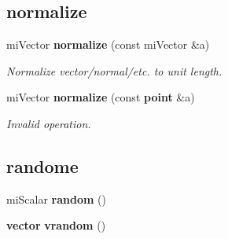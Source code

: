 \subsection*{normalize}
\begin{CompactItemize}
\item 
mi\-Vector {\bf normalize} (const mi\-Vector \&a)
\begin{CompactList}\small\item\em Normalize vector/normal/etc. to unit length. \item\end{CompactList}\item 
mi\-Vector {\bf normalize} (const {\bf point} \&a)
\begin{CompactList}\small\item\em Invalid operation. \item\end{CompactList}\end{CompactItemize}
\subsection*{randome}
\begin{CompactItemize}
\item 
mi\-Scalar {\bf random} ()
\item 
{\bf vector} {\bf vrandom} ()
\end{CompactItemize}
